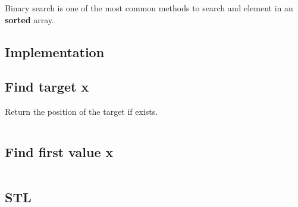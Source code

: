 Binary search is one of the most common methods to search and element in an \textbf{sorted} array.

\subsection{Implementation}
    \subsection{Find target x}
        Return the position of the target if exists.
        \inputminted{cpp}{BinarySearch/Code/findTarget.cpp}
        
        
    \subsection{Find first value x}
        \inputminted{cpp}{BinarySearch/Code/firstValueGEx.cpp}
\subsection{STL}